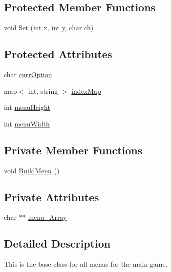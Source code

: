 \subsection*{Protected Member Functions}
\begin{DoxyCompactItemize}
\item 
void \hyperlink{classMenu_aa13913062e78fbd036ca698e0c0c5038}{Set} (int x, int y, char ch)
\end{DoxyCompactItemize}
\subsection*{Protected Attributes}
\begin{DoxyCompactItemize}
\item 
char \hyperlink{classMenu_a8cabd1390fcc59aba53b79788915c792}{curr\-Option}
\item 
map$<$ int, string $>$ \hyperlink{classMenu_a18566c84b43074d03f0ad3cacd748aae}{index\-Map}
\item 
int \hyperlink{classMenu_ad9364e391e91acd266444a2604cb838e}{menu\-Height}
\item 
int \hyperlink{classMenu_a5c90eda61cd9071dcafda04569dfdd67}{menu\-Width}
\end{DoxyCompactItemize}
\subsection*{Private Member Functions}
\begin{DoxyCompactItemize}
\item 
void \hyperlink{classMenu_aaae232bbb2e874c2abb18b470259ab33}{Build\-Menu} ()
\end{DoxyCompactItemize}
\subsection*{Private Attributes}
\begin{DoxyCompactItemize}
\item 
char $\ast$$\ast$ \hyperlink{classMenu_a6fdd29d716c7fb985f038ddde93794a0}{menu\-\_\-\-Array}
\end{DoxyCompactItemize}


\subsection{Detailed Description}
This is the base class for all menus for the main game. 


